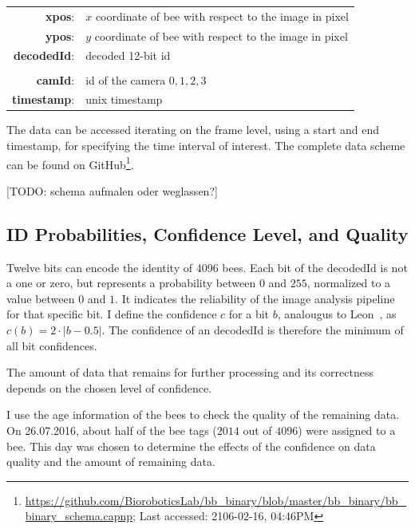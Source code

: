 \begin{table}[!h]
\centering
\begin{tabular}{rl}
\textbf{xpos}: & $x$ coordinate of bee with respect to the image in pixel \\
\textbf{ypos}: & $y$ coordinate of bee with respect to the image in pixel \\
\textbf{decodedId}: & decoded 12-bit id \\
\\
\textbf{camId}: & id of the camera ${0,1,2,3}$ \\
\textbf{timestamp}: & unix timestamp \\
\end{tabular}
\end{table}

The data can be accessed iterating on the frame level, using a start and end timestamp, for specifying the time interval of interest. The complete data scheme can be found on GitHub\footnote{\url{https://github.com/BioroboticsLab/bb_binary/blob/master/bb_binary/bb_binary_schema.capnp}; Last accessed: 2106-02-16, 04:46PM}. 

[TODO: schema aufmalen oder weglassen?]\\

\subsection{ID Probabilities, Confidence Level, and Quality}
\label{subsec:confidence}

Twelve bits can encode the identity of 4096 bees.
Each bit of the decodedId is not a one or zero, but represents a probability between $0$ and $255$, normalized to a value between $0$ and $1$. It indicates the reliability of the image analysis pipeline for that specific bit.
I define the confidence $c$ for a bit $b$, analougus to Leon~\textcite[p.~14]{leon2016}, as $c(b)=2\cdot|b-0.5|$. The confidence of an decodedId is therefore the minimum of all bit confidences.

The amount of data that remains for further processing and its correctness depends on the chosen level of confidence.

I use the age information of the bees to check the quality of the remaining data. On 26.07.2016, about half of the bee tags ($2014$ out of $4096$) were assigned to a bee. This day was chosen to determine the effects of the confidence on data quality and the amount of remaining data.

